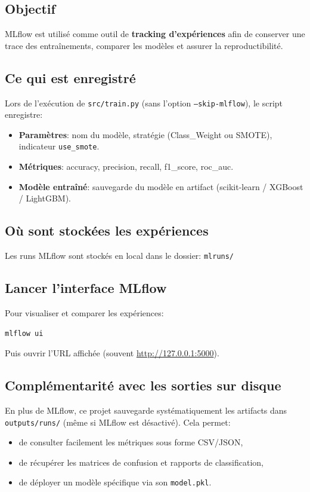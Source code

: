 \documentclass[11pt,a4paper]{article}
\begin{document}
\subsection{Objectif}
MLflow est utilis\'e comme outil de \textbf{tracking d'exp\'eriences} afin de conserver une trace des entra\^inements, comparer les mod\`eles et assurer la reproductibilit\'e.

\subsection{Ce qui est enregistr\'e}
Lors de l'ex\'ecution de \texttt{src/train.py} (sans l'option \texttt{--skip-mlflow}), le script enregistre:
\begin{itemize}
  \item \textbf{Param\`etres}: nom du mod\`ele, strat\'egie (Class\_Weight ou SMOTE), indicateur \texttt{use\_smote}.
  \item \textbf{M\'etriques}: accuracy, precision, recall, f1\_score, roc\_auc.
  \item \textbf{Mod\`ele entra\^in\'e}: sauvegarde du mod\`ele en artifact (scikit-learn / XGBoost / LightGBM).
\end{itemize}

\subsection{O\`u sont stock\'ees les exp\'eriences}
Les runs MLflow sont stock\'es en local dans le dossier:\newline
\texttt{mlruns/}

\subsection{Lancer l'interface MLflow}
Pour visualiser et comparer les exp\'eriences:
\begin{verbatim}
mlflow ui
\end{verbatim}
Puis ouvrir l'URL affich\'ee (souvent \url{http://127.0.0.1:5000}).

\subsection{Compl\'ementarit\'e avec les sorties sur disque}
En plus de MLflow, ce projet sauvegarde syst\'ematiquement les artifacts dans \texttt{outputs/runs/} (m\^eme si MLflow est d\'esactiv\'e). Cela permet:
\begin{itemize}
  \item de consulter facilement les m\'etriques sous forme CSV/JSON,
  \item de r\'ecup\'erer les matrices de confusion et rapports de classification,
  \item de d\'eployer un mod\`ele sp\'ecifique via son \texttt{model.pkl}.
\end{itemize}
\end{document}
